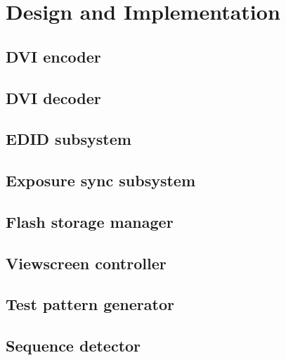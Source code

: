 \chapter{Design and Implementation}




\section{DVI encoder}


\section{DVI decoder}
\section{EDID subsystem}
\section{Exposure sync subsystem}
\section{Flash storage manager}
\section{Viewscreen controller}
\section{Test pattern generator}
\section{Sequence detector}